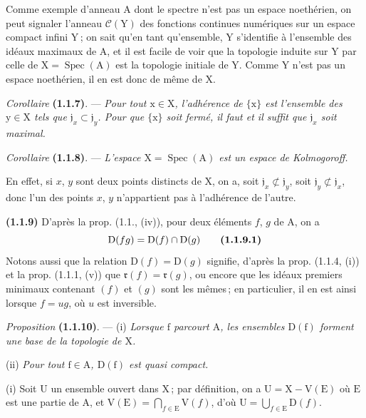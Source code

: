 Comme exemple d’anneau $\mathrm{A}$ dont le spectre n’est pas un espace noethérien, on peut signaler l’anneau $\mathscr{C}(\mathrm{Y})$ des fonctions continues numériques sur un espace compact infini $\mathrm{Y}$\,; on sait qu’en tant qu’ensemble, $\mathrm{Y}$ s’identifie à l’ensemble des idéaux maximaux de $\mathrm{A}$, et il est facile de voir que la topologie induite sur $\mathrm{Y}$ par celle de $\mathrm{X}=\operatorname{Spec}(\mathrm{A})$ est la topologie initiale de $\mathrm{Y}$. Comme $\mathrm{Y}$ n’est pas un espace noethérien, il en est donc de même de $\mathrm{X}$.

\textit{Corollaire} \textbf{(1.1.7)}. --- \textit{Pour tout $\mathrm{x}\in \mathrm{X}$, l’adhérence de $\{\mathrm{x}\}$ est l’ensemble des $\mathrm{y}\in \mathrm{X}$ tels que $\mathfrak{j}_x\subset\mathfrak{j}_y$. Pour que $\{\mathrm{x}\}$ soit fermé, il faut et il suffit que $\mathfrak{j}_x$ soit maximal.}

\textit{Corollaire} \textbf{(1.1.8)}. --- \textit{L’espace $\mathrm{X}=\operatorname{Spec}(\mathrm{A})$ est un espace de Kolmogoroff.}

En effet, si $x$, $y$ sont deux points distincts de $\mathrm{X}$, on a, soit $\mathfrak{j}_x\not\subset\mathfrak{j}_y$, soit $\mathfrak{j}_y\not\subset\mathfrak{j}_x$, donc l’un des points $x$, $y$ n’appartient pas à l’adhérence de l’autre.

\textbf{(1.1.9)} D’après la prop. (1.1., (iv)), pour deux éléments $f$, $g$ de $\mathrm{A}$, on a
\[
\mathrm{D}(fg)=\mathrm{D}(f)\cap \mathrm{D}(g)
\tag*{\textbf{(1.1.9.1)}}
\]
Notons aussi que la relation $\mathrm{D}(f)=\mathrm{D}(g)$ signifie, d’après la prop. (1.1.4, (i)) et la prop. (1.1.1, (v)) que $\mathfrak{r}(f)=\mathfrak{r}(g)$, ou encore que les idéaux premiers minimaux contenant $(f)$ et $(g)$ sont les mêmes\,; en particulier, il en est ainsi lorsque $f=ug$, où $u$ est inversible.

\textit{Proposition} \textbf{(1.1.10)}. --- (i) \textit{Lorsque $\mathrm{f}$ parcourt $\mathrm{A}$, les ensembles $\mathrm{D}(\mathrm{f})$ forment une base de la topologie de $\mathrm{X}$.}

(ii) \textit{Pour tout $\mathrm{f}\in \mathrm{A}$, $\mathrm{D}(\mathrm{f})$ est quasi compact.} 

(i) Soit $\mathrm{U}$ un ensemble ouvert dans $\mathrm{X}$\,; par définition, on a $\mathrm{U}=\mathrm{X}-\mathrm{V}(\mathrm{E})$ où $\mathrm{E}$ est une partie de $\mathrm{A}$, et $\mathrm{V}(\mathrm{E})=\bigcap_{f\in \mathrm{E}}\mathrm{V}(f)$, d’où $\mathrm{U}=\bigcup_{f\in \mathrm{E}}\mathrm{D}(f)$.
\endgroup
